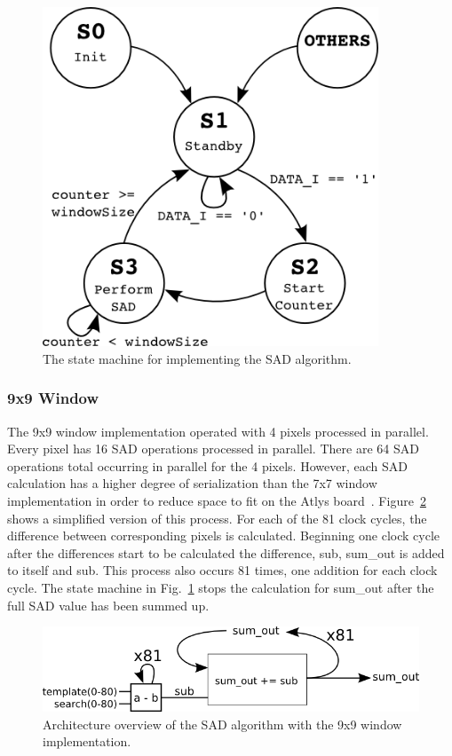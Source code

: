 \begin{figure}[h]
	\begin{center}
		\includegraphics[width=100mm]{figures/stateMachine.png}
		\captionfonts
		\caption{The state machine for implementing the SAD algorithm.}
		\label{fig:stateMachine}
	\end{center}
\end{figure}

\subsubsection{9x9 Window}
\label{sec:9x9window}

The 9x9 window implementation operated with 4 pixels processed in parallel. Every pixel has 16 SAD operations processed in parallel. There are 64 SAD operations total occurring in parallel for the 4 pixels. However, each SAD calculation has a higher degree of serialization than the 7x7 window implementation in order to reduce space to fit on the Atlys board~\cite{atlysBoard}. Figure~\ref{fig:sadAlg9x9} shows a simplified version of this process. For each of the 81 clock cycles, the difference between corresponding pixels is calculated. Beginning one clock cycle after the differences start to be calculated the difference, sub, sum\_out is added to itself and sub. This process also occurs 81 times, one addition for each clock cycle. The state machine in Fig.~\ref{fig:stateMachine} stops the calculation for sum\_out after the full SAD value has been summed up.

\begin{figure}[h]
	\begin{center}
		\includegraphics[width=120mm]{figures/sadAlgorithm9x9.png}
		\captionfonts
		\caption{Architecture overview of the SAD algorithm with the 9x9 window implementation.}
		\label{fig:sadAlg9x9}
	\end{center}
\end{figure}

